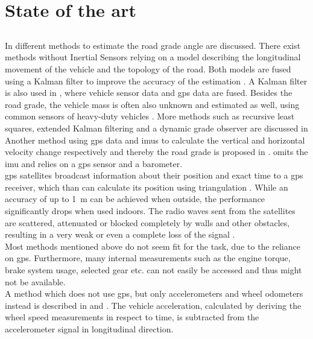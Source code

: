 \chapter{State of the art}
\label{ch:StateOfTheArt}

\section{}
In \cite{Jauch2018} different methods to estimate the road grade angle are discussed.
There exist methods without Inertial Sensors relying on a model describing the longitudinal movement of the vehicle and the topology of the road.
Both models are fused using a Kalman filter to improve the accuracy of the estimation \cite{Sahlholm2007}.
A Kalman filter is also used in \cite{Sahlholm2010}, where vehicle sensor data and \gls{gps} data are fused.
Besides the road grade, the vehicle mass is often also unknown and estimated as well, using common sensors of heavy-duty vehicles \cite{Sahlholm2010, Maleej2014}.
More methods such as recursive least squares, extended Kalman filtering and a dynamic grade observer are discussed in \cite{Kidambi2014}
Another method using \gls{gps} data and \gls{imu}s to calculate the vertical and horizontal velocity change respectively and thereby the road grade is proposed in \cite{Ryu2004}.
\cite{YazdaniBoroujeni2014} omits the \gls{imu} and relies on a \gls{gps} sensor and a barometer.\\
\gls{gps} satellites broadcast information about their position and exact time to a \gls{gps} receiver, which than can calculate its position using triangulation \cite{Mainetti2014}.
While an accuracy of up to \SI{1}{\metre} can be achieved when outside, the performance significantly drops when used indoors.
The radio waves sent from the satellites are scattered, attenuated or blocked completely by walls and other obstacles, resulting in a very weak or even a complete loss of the signal \cite{Ozdenizci2015}.\\
Most methods mentioned above do not seem fit for the task, due to the reliance on \gls{gps}.
Furthermore, many internal measurements such as the engine torque, brake system usage, selected gear etc. can not easily be accessed and thus might not be available.\\
A method which does not use \gls{gps}, but only accelerometers and wheel odometers instead is described in \cite{Nilsson2012} and \cite{Palella2016}.
The vehicle acceleration, calculated by deriving the wheel speed measurements in respect to time, is subtracted from the accelerometer signal in longitudinal direction.
